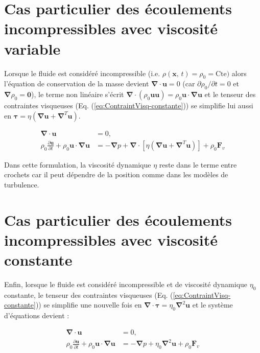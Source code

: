 \section{Cas particulier des \'ecoulements incompressibles avec viscosit\'e variable}

Lorsque le fluide est consid\'er\'e incompressible (i.e. $\rho(\mathbf{x},\,t)=\rho_{0}=\mbox{Cte})$
alors l'\'equation de conservation de la masse devient $\boldsymbol{\nabla}\cdot\mathbf{u}=0$
(car $\partial\rho_{0}/\partial t=0$ et $\boldsymbol{\nabla}\rho_{0}=\mathbf{0}$),
le terme non lin\'eaire s'\'ecrit $\boldsymbol{\nabla}\cdot(\rho_{0}\mathbf{u}\mathbf{u})=\rho_{0}\mathbf{u}\cdot\boldsymbol{\nabla}\mathbf{u}$
et le tenseur des contraintes visqueuses (Eq. (\ref{eq:ContraintVisq-constante}))
se simplifie lui aussi en $\boldsymbol{\tau}=\eta(\boldsymbol{\nabla}\mathbf{u}+\boldsymbol{\nabla}^{T}\mathbf{u})$. 

\begin{subequations}

\begin{align}
\boldsymbol{\nabla}\cdot\mathbf{u} & =0,\label{eq:ContinuiteMP-1}\\
\rho_{0}\frac{\partial\mathbf{u}}{\partial t}+\rho_{0}\mathbf{u}\cdot\boldsymbol{\nabla}\mathbf{u} & =-\boldsymbol{\nabla}p+\boldsymbol{\nabla}\cdot\left[\eta(\boldsymbol{\nabla}\mathbf{u}+\boldsymbol{\nabla}^{T}\mathbf{u})\right]+\rho_{0}\mathbf{F}_{v}\label{eq:DBF-1-1}
\end{align}


\end{subequations}

Dans cette formulation, la viscosit\'e dynamique $\eta$ reste dans
le terme entre crochets car il peut d\'ependre de la position comme
dans les mod\`eles de turbulence.


\section{Cas particulier des \'ecoulements incompressibles avec viscosit\'e constante}

Enfin, lorsque le fluide est consid\'er\'e incompressible et de viscosit\'e
dynamique $\eta_{0}$ constante, le tenseur des contraintes visqueuses
(Eq. (\ref{eq:ContraintVisq-constante})) se simplifie une nouvelle
fois en $\boldsymbol{\nabla}\cdot\boldsymbol{\tau}=\eta_{0}\boldsymbol{\nabla}^{2}\mathbf{u}$
et le syst\`eme d'\'equations devient :

\begin{subequations}

\begin{align}
\boldsymbol{\nabla}\cdot\mathbf{u} & =0,\label{eq:ContinuiteMP}\\
\rho_{0}\frac{\partial\mathbf{u}}{\partial t}+\rho_{0}\mathbf{u}\cdot\boldsymbol{\nabla}\mathbf{u} & =-\boldsymbol{\nabla}p+\eta_{0}\boldsymbol{\nabla}^{2}\mathbf{u}+\rho_{0}\mathbf{F}_{v}\label{eq:DBF-1}
\end{align}


\end{subequations}

